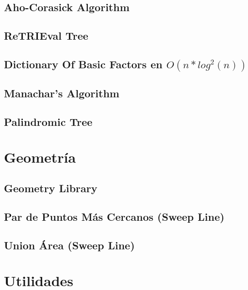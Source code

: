 \subsection{Aho-Corasick Algorithm}
\raggedbottom
\hrulefill
\subsection{ReTRIEval Tree}
\raggedbottom
\hrulefill
\subsection{Dictionary Of Basic Factors en $O(n * log^{2}(n))$}
\raggedbottom
\hrulefill
\subsection{Manachar's Algorithm}
\raggedbottom
\hrulefill
\subsection{Palindromic Tree}
\raggedbottom
\hrulefill

\section{Geometr\'ia}
\subsection{Geometry Library}
\raggedbottom
\hrulefill
\subsection{Par de Puntos M\'as Cercanos (Sweep Line)}
\raggedbottom
\hrulefill
\subsection{Union \'Area (Sweep Line)}
\raggedbottom
\hrulefill

\section{Utilidades}
